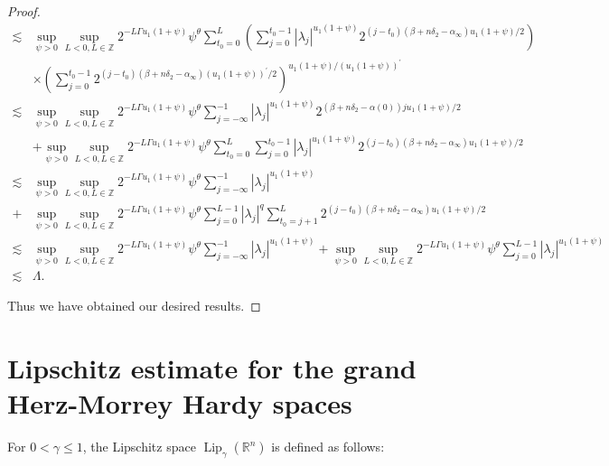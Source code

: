 \documentclass[oneside,reqno]{amsart}
\numberwithin{equation}{section}
\theoremstyle{definition}
\begin{document}
\begin{proof}
\begin{align*}
\lesssim & \sup_{\psi>0}\sup _{L <  0, L \in \mathbb{Z}} 2^{-L \Gamma u_1(1+\psi)} \psi^\theta \sum_{t_0=0}^{L}\left(\sum_{j=0}^{t_0-1}\left|\lambda_{j}\right|^{u_1(1+\psi)} 2^{(j-t_0)\left(\beta+n\delta_2-\alpha_{\infty}\right) u_1(1+\psi) / 2}\right) \\
& \times\left(\sum_{j=0}^{t_0-1} 2^{(j-t_0)\left(\beta+n\delta_2-\alpha_{\infty}\right) (u_1(1+\psi))^{\prime} / 2}\right)^{u_1(1+\psi) / (u_1(1+\psi))^{\prime}}\\
\lesssim & \sup_{\psi>0}\sup _{L <  0, L \in \mathbb{Z}} 2^{-L \Gamma u_1(1+\psi)} \psi^\theta \sum_{j=-\infty}^{-1}\left|\lambda_{j}\right|^{u_1(1+\psi)} 2^{\left(\beta+n\delta_2-\alpha(0)\right) j u_1(1+\psi) / 2} \\
& +\sup_{\psi>0}\sup _{L <  0, L \in \mathbb{Z}} 2^{-L \Gamma u_1(1+\psi)} \psi^\theta \sum_{t_0=0}^{L} \sum_{j=0}^{t_0-1}\left|\lambda_{j}\right|^{u_1(1+\psi)} 2^{(j-t_0)\left(\beta+n\delta_2-\alpha_{\infty}\right) u_1(1+\psi) / 2} \\
\lesssim & \sup_{\psi>0}\sup _{L <  0, L \in \mathbb{Z}} 2^{-L \Gamma u_1(1+\psi)} \psi^\theta \sum_{j=-\infty}^{-1}\left|\lambda_{j}\right|^{u_1(1+\psi)} \\
+& \sup_{\psi>0}\sup _{L <  0, L \in \mathbb{Z}} 2^{-L \Gamma u_1(1+\psi)} \psi^\theta \sum_{j=0}^{L-1}\left|\lambda_{j}\right|^{q} \sum_{t_0=j+1}^{L} 2^{(j-t_0)\left(\beta+n\delta_2-\alpha_{\infty}\right) u_1(1+\psi) / 2} \\
\lesssim & \sup_{\psi>0}\sup _{L <  0, L \in \mathbb{Z}} 2^{-L \Gamma u_1(1+\psi)} \psi^\theta \sum_{j=-\infty}^{-1}\left|\lambda_{j}\right|^{u_1(1+\psi)}+\sup_{\psi>0}\sup _{L <  0, L \in \mathbb{Z}} 2^{-L \Gamma u_1(1+\psi)} \psi^\theta \sum_{j=0}^{L-1}\left|\lambda_{j}\right|^{u_1(1+\psi)}\\
\lesssim & \Lambda .
\end{align*}





Thus we have obtained our desired results. 

\end{proof}




\section{Lipschitz estimate for the grand Herz-Morrey  Hardy spaces}


For $0<\gamma \leq 1$, the Lipschitz space $\operatorname{Lip}_{\gamma}\left(\mathbb{R}^{n}\right)$ is defined as follows:
\end{document}
